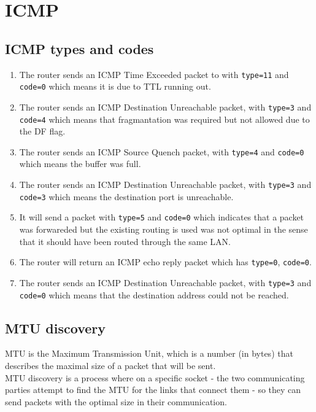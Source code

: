 \section{ICMP}
\subsection{ICMP types and codes}
\begin{enumerate}[label=\textbf{\alph*.}]
    \item The router sends an ICMP Time Exceeded packet to
    with \texttt{type=11} and \texttt{code=0} which means it is due to TTL running out.
    \item The router sends an ICMP Destination Unreachable packet,
    with \texttt{type=3} and \texttt{code=4} which means that fragmantation was required
    but not allowed due to the DF flag.
    \item The router sends an ICMP Source Quench packet,
    with \texttt{type=4} and \texttt{code=0} which means the buffer was full.
    \item The router sends an ICMP Destination Unreachable packet,
    with \texttt{type=3} and \texttt{code=3} which means
    the destination port is unreachable.
    \item It will send a packet with \texttt{type=5} and \texttt{code=0}
    which indicates that a packet was forwareded but the existing routing is used was not optimal in
    the sense that it should have been routed through the same LAN.
    \item The router will return an ICMP echo reply packet
    which has \texttt{type=0}, \texttt{code=0}.
    \item The router sends an ICMP Destination Unreachable packet,
    with \texttt{type=3} and \texttt{code=0} which
    means that the destination address could not be reached.
\end{enumerate}
\subsection{MTU discovery}
MTU is the Maximum Transmission Unit,
which is a number (in bytes) that describes the maximal size of a packet
that will be sent.\\
MTU discovery is a process where on a specific socket - the two communicating
parties attempt to find the MTU for the links that connect them - so
they can send packets with the optimal size in their communication.\\

